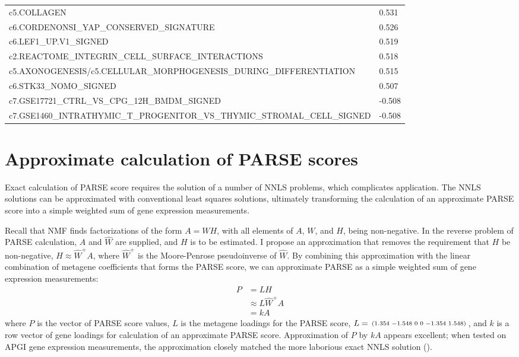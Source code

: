 \begin{table}[!htbp]
\begin{tabular}{@{}ll@{}}
c5.COLLAGEN                                                                       & 0.531       \\
c6.CORDENONSI\_YAP\_CONSERVED\_SIGNATURE                                          & 0.526       \\
c6.LEF1\_UP.V1\_SIGNED                                                            & 0.519       \\
c2.REACTOME\_INTEGRIN\_CELL\_SURFACE\_INTERACTIONS                                & 0.518       \\
c5.AXONOGENESIS/c5.CELLULAR\_MORPHOGENESIS\_DURING\_DIFFERENTIATION               & 0.515       \\
c6.STK33\_NOMO\_SIGNED                                                            & 0.507       \\
c7.GSE17721\_CTRL\_VS\_CPG\_12H\_BMDM\_SIGNED                                     & -0.508      \\
c7.GSE1460\_INTRATHYMIC\_T\_PROGENITOR\_VS\_THYMIC\_STROMAL\_CELL\_SIGNED         & -0.508      \\ \bottomrule
\end{tabular}
\end{table}


\chapter{Approximate calculation of \acrshort{PARSE} scores}
\label{app:sigs-parse-approx}
Exact calculation of \gls{PARSE} score requires the solution of a number of \gls{NNLS} problems, which complicates application.  The \gls{NNLS} solutions can be approximated with conventional least squares solutions, ultimately transforming the calculation of an approximate \gls{PARSE} score into a simple weighted sum of gene expression measurements.

Recall that \gls{NMF} finds factorizations of the form $A = W H$, with all elements of $A$, $W$, and $H$, being non-negative.  In the reverse problem of \gls{PARSE} calculation, $A$ and $\widehat{W}$ are supplied, and $H$ is to be estimated.  I propose an approximation that removes the requirement that $H$ be non-negative, $H \approx \widehat{W}^+ A$, where $\widehat{W}^+$ is the Moore-Penrose pseudoinverse of $\widehat{W}$.  By combining this approximation with the linear combination of metagene coefficients that forms the \gls{PARSE} score, we can approximate \gls{PARSE} as a simple weighted sum of gene expression measurements:
\begin{align}
  P &= L H \\
    &\approx L \widehat{W}^+ A \\
    &= k A
\end{align}
where $P$ is the vector of \gls{PARSE} score values, $L$ is the metagene loadings for the \gls{PARSE} score, $L = \begin{smallmatrix}(1.354&-1.548&0&0&-1.354&1.548)\end{smallmatrix}$, and $k$ is a row vector of gene loadings for calculation of an approximate \gls{PARSE} score.  Approximation of $P$ by $k A$ appears excellent; when tested on \gls{APGI} gene expression measurements, the approximation closely matched the more laborious exact \gls{NNLS} solution ().

